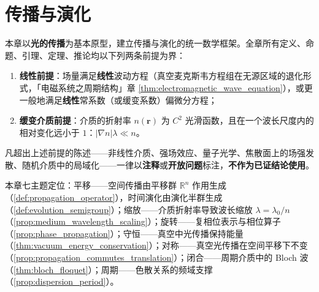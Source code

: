 \chapter{传播与演化}
\label{chap:propagation}

\begin{remark}[本章定位与严格前提]\label{rem:propagation_chapter_positioning}
本章以\textbf{光的传播}为基本原型，建立传播与演化的统一数学框架。全章所有定义、命题、引理、定理、推论均以下列两条前提为界：

\begin{enumerate}[label=(\alph*)]
    \item \textbf{线性前提}：场量满足\textbf{线性}波动方程（真空麦克斯韦方程组在无源区域的退化形式，「电磁系统之周期结构」章 \cref{thm:electromagnetic_wave_equation}），或更一般地满足\textbf{线性}常系数（或缓变系数）偏微分方程；
    \item \textbf{缓变介质前提}：介质的折射率 $n(\mathbf{r})$ 为 $C^2$ 光滑函数，且在一个波长尺度内的相对变化远小于 $1$：$|\nabla n|\lambda \ll n$。
\end{enumerate}

凡超出上述前提的陈述——非线性介质、强场效应、量子光学、焦散面上的场强发散、随机介质中的局域化——一律以\textbf{注释}或\textbf{开放问题}标注，\textbf{不作为已证结论使用}。

本章七主题定位：平移——空间传播由平移群 $\mathbb{R}^n$ 作用生成（\cref{def:propagation_operator}），时间演化由演化半群生成（\cref{def:evolution_semigroup}）；缩放——介质折射率导致波长缩放 $\lambda = \lambda_0/n$（\cref{prop:medium_wavelength_scaling}）；旋转——复相位表示与相位算子（\cref{prop:phase_propagation}）；守恒——真空中光传播保持能量（\cref{thm:vacuum_energy_conservation}）；对称——真空光传播在空间平移下不变（\cref{prop:propagation_commutes_translation}）；闭合——周期介质中的 Bloch 波（\cref{thm:bloch_floquet}）；周期——色散关系的频域支撑（\cref{prop:dispersion_period}）。
\end{remark}

